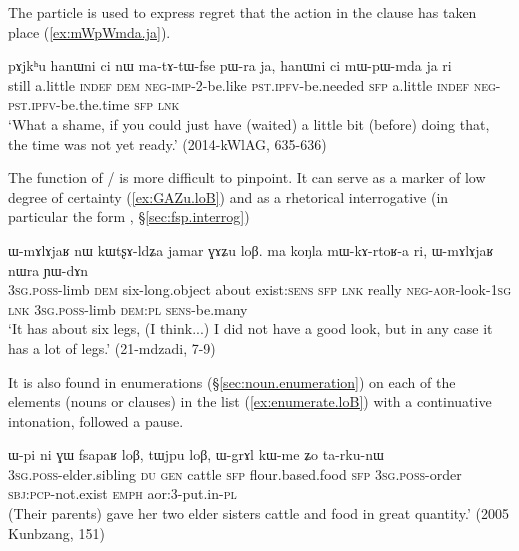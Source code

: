 The particle  is used to express regret that the action in the clause has taken place (\ref{ex:mWpWmda.ja}).

\begin{exe} 
\ex \label{ex:mWpWmda.ja}
\gll   pɤjkʰu hanɯni ci nɯ ma-tɤ-tɯ-fse pɯ-ra ja, hanɯni ci mɯ-pɯ-mda ja ri \\
still a.little \textsc{indef} \textsc{dem} \textsc{neg}-\textsc{imp}-2-be.like \textsc{pst}.\textsc{ipfv}-be.needed \textsc{sfp} 
 a.little \textsc{indef}   \textsc{neg}-\textsc{pst}.\textsc{ipfv}-be.the.time \textsc{sfp}  \textsc{lnk} \\
\glt `What a shame, if you could just have (waited) a little bit (before) doing that, the time was not yet ready.' (2014-kWlAG, 635-636)
\end{exe} 

The function of  /  is more difficult to pinpoint. It can serve as a marker of low degree of certainty (\ref{ex:GAZu.loB}) and as a rhetorical interrogative (in particular the form , §\ref{sec:fsp.interrog})


\begin{exe} 
\ex \label{ex:GAZu.loB}
\gll  ɯ-mɤlɤjaʁ nɯ kɯtʂɤ-ldʑa jamar ɣɤʑu loβ. ma koŋla mɯ-kɤ-rtoʁ-a ri, ɯ-mɤlɤjaʁ nɯra ɲɯ-dɤn \\
 \textsc{3sg}.\textsc{poss}-limb \textsc{dem} six-long.object about exist:\textsc{sens} \textsc{sfp} \textsc{lnk} really \textsc{neg}-\textsc{aor}-look-\textsc{1sg} \textsc{lnk}  \textsc{3sg}.\textsc{poss}-limb \textsc{dem}:\textsc{pl} \textsc{sens}-be.many \\
 \glt `It has about six legs, (I think...) I did not have a good look, but in any case it has a lot of legs.' (21-mdzadi, 7-9)
 \end{exe} 

It is also found in enumerations (§\ref{sec:noun.enumeration}) on each of the elements (nouns or clauses) in the list (\ref{ex:enumerate.loB}) with a continuative intonation, followed a pause.

\begin{exe} 
\ex \label{ex:enumerate.loB}
\gll ɯ-pi ni ɣɯ  fsapaʁ loβ, tɯjpu loβ, ɯ-grɤl kɯ-me ʑo ta-rku-nɯ \\
\textsc{3sg}.\textsc{poss}-elder.sibling \textsc{du} \textsc{gen} cattle \textsc{sfp} flour.based.food  \textsc{sfp} \textsc{3sg}.\textsc{poss}-order \textsc{sbj}:\textsc{pcp}-not.exist \textsc{emph} aor:3\flobv{}-put.in-\textsc{pl} \\
\glt (Their parents) gave her two elder sisters cattle and food in great quantity.' (2005 Kunbzang, 151)
 \end{exe} 

 